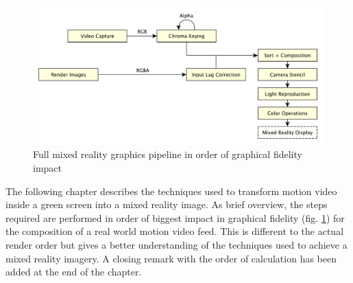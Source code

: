 \begin{figure}[htb]
	\centering
	\includegraphics[width=\textwidth]{gfx/pipeline/4_0_pipeline.pdf}
	\caption{Full mixed reality graphics pipeline in order of graphical 
	fidelity impact}
	\label{fig:steps:pipeline}
\end{figure}

The following chapter describes the techniques used to transform motion video 
inside a green screen into a mixed reality image. As brief overview, the steps 
required are performed in order of biggest impact in graphical fidelity (fig. 
\ref{fig:steps:pipeline}) for the composition of a real world motion video 
feed. This is different to the actual render order but gives a better 
understanding of the techniques used to achieve a mixed reality imagery. A 
closing remark with the order of calculation has been added at the end of the 
chapter.

